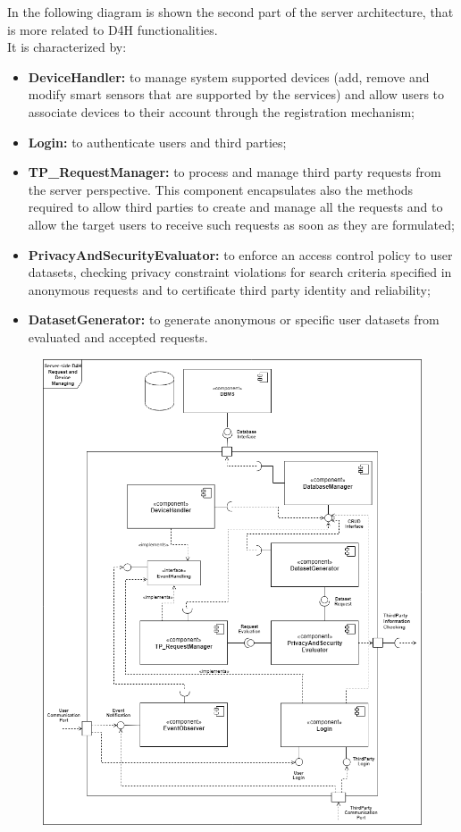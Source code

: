 \begin{flushleft}
{In the following diagram is shown the second part of the server architecture, that is more related to D4H functionalities.\\
It is characterized by:
\begin{itemize}
	\item \textbf{DeviceHandler:} to manage system supported devices (add, remove and modify smart sensors that are supported by the services) and allow users to associate devices to their account through the registration mechanism; 
	\item \textbf{Login:} to authenticate users and third parties;
	\item \textbf{TP\_RequestManager:} to process and manage third party requests from the server perspective. This component encapsulates also the methods required to allow third parties to create and manage all the requests and to allow the target users to receive such requests as soon as they are formulated;
	\item \textbf{PrivacyAndSecurityEvaluator:} to enforce an access control policy to user datasets, checking privacy constraint violations for search criteria specified in anonymous requests and to certificate third party identity and reliability;
	\item \textbf{DatasetGenerator:} to generate anonymous or specific user datasets from evaluated and accepted requests. 
\end{itemize}
\begin{figure}[H]
	\centering
	\includegraphics[scale=0.4]{images/uml/D4H_server_requestManaging_component}

\end{figure}}
\end{flushleft}

